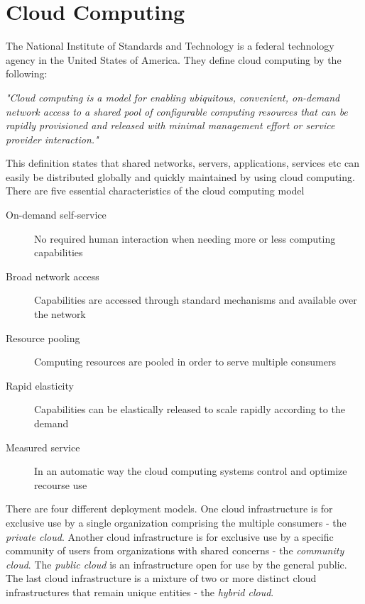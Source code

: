 \documentclass[11pt]{report}
\begin{document}
\section{Cloud Computing}
The National Institute of Standards and Technology is a federal technology agency in the United States of America. They define cloud computing by the following:
\begin{center}
\emph{"Cloud computing is a model for enabling ubiquitous, convenient, on-demand network access to a shared pool of configurable computing resources that can be rapidly provisioned and released with minimal management effort or service provider interaction."} \cite{clouddefinition}
\end{center}
This definition states that shared networks, servers, applications, services etc can easily be distributed globally and quickly maintained by using cloud computing.\\

There are five essential characteristics of the cloud computing model
\begin{description}
\item[On-demand self-service] No required human interaction when needing more or less computing capabilities
\item[Broad network access] Capabilities are accessed through standard mechanisms and available over the network
\item[Resource pooling] Computing resources are pooled in order to serve multiple consumers 
\item[Rapid elasticity] Capabilities can be elastically released to scale rapidly according to the demand
\item[Measured service] In an automatic way the cloud computing systems control and optimize recourse use
\end{description}

There are four different deployment models. One cloud infrastructure is for exclusive use by a single organization comprising the multiple consumers - the \emph{private cloud}. Another cloud infrastructure is for exclusive use by a specific community of users from organizations with shared concerns - the \emph{community cloud}. The \emph{public cloud} is an infrastructure open for use by the general public. The last cloud infrastructure is a mixture of two or more distinct cloud infrastructures that remain unique entities - the \emph{hybrid cloud}.
\end{document}
